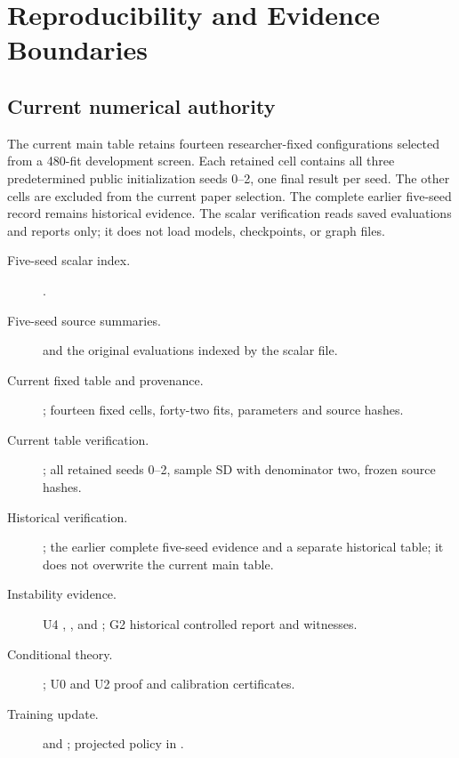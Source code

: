 \chapter{Reproducibility and Evidence Boundaries}\label{app:evidence}
\section{Current numerical authority}
The current main table retains fourteen researcher-fixed configurations selected from a 480-fit development screen. Each retained cell contains all three predetermined public initialization seeds 0--2, one final result per seed. The other cells are excluded from the current paper selection. The complete earlier five-seed record remains historical evidence. The scalar verification reads saved evaluations and reports only; it does not load models, checkpoints, or graph files.

\begingroup\small\raggedright
\begin{description}
\item[Five-seed scalar index.] .
\item[Five-seed source summaries.]  and the original evaluations indexed by the scalar file.
\item[Current fixed table and provenance.] ; fourteen fixed cells, forty-two fits, parameters and source hashes.
\item[Current table verification.] ; all retained seeds 0--2, sample SD with denominator two, frozen source hashes.
\item[Historical verification.] ; the earlier complete five-seed evidence and a separate historical table; it does not overwrite the current main table.
\item[Instability evidence.] U4 , , and ; G2 historical controlled report and witnesses.
\item[Conditional theory.] ; U0 and U2 proof and calibration certificates.
\item[Training update.]  and ; projected policy in .
\end{description}
\endgroup

